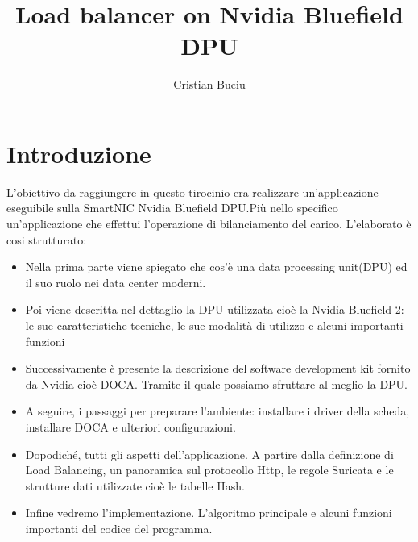 \documentclass[binding=0.6cm]{sapthesis}
\title{Load balancer on Nvidia Bluefield DPU}
\author{Cristian Buciu }
\theoremstyle{definition}
\begin{document}
\frontmatter
\maketitle





\tableofcontents
\let\cleardoublepage\clearpage

\mainmatter
\chapter{Introduzione}
L'obiettivo da raggiungere in questo tirocinio era realizzare un'applicazione eseguibile 
sulla SmartNIC Nvidia Bluefield DPU.Più nello specifico un'applicazione che effettui
l'operazione di bilanciamento del carico.
L'elaborato è cosi strutturato:
\begin{itemize}
    \item Nella prima parte viene spiegato che cos'è una data processing unit(DPU) ed il suo 
          ruolo nei data center moderni.
    \item Poi viene descritta nel dettaglio la DPU utilizzata cioè la Nvidia Bluefield-2: 
    le sue caratteristiche tecniche, le sue modalità di utilizzo e alcuni importanti funzioni
    \item Successivamente è presente la descrizione del software development kit
    fornito da Nvidia cioè DOCA. Tramite il quale possiamo sfruttare al meglio la DPU.
    \item A seguire, i passaggi per preparare l'ambiente: installare i driver della scheda,
        installare DOCA e ulteriori configurazioni.
    \item Dopodiché, tutti gli aspetti dell'applicazione. A partire dalla definizione di Load Balancing,
        un panoramica sul protocollo Http, le regole Suricata e le strutture dati utilizzate cioè 
        le tabelle Hash.
    \item Infine vedremo l'implementazione. L'algoritmo principale e alcuni funzioni importanti
          del codice del programma.

\end{itemize}
\end{document}
